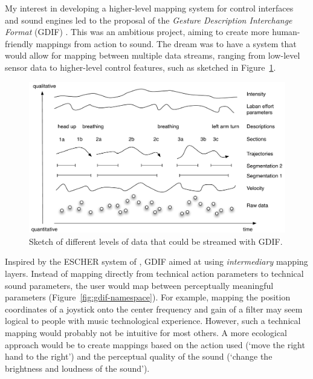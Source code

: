 My interest in developing a higher-level mapping system for control interfaces and sound engines led to the proposal of the \emph{Gesture Description Interchange Format} (GDIF) \citep{jensenius_towards_2006}. This was an ambitious project, aiming to create more human-friendly mappings from action to sound. The dream was to have a system that would allow for mapping between multiple data streams, ranging from low-level sensor data to higher-level control features, such as sketched in Figure~\ref{fig:gdif-streams}.

\begin{figure}[tbp]
 			\includegraphics[width=1\columnwidth]{figures/34-gdif-streams.pdf}
 			\caption{Sketch of different levels of data that could be streamed with GDIF.}
            \label{fig:gdif-streams}
\end{figure}

Inspired by the ESCHER system of \citet{wanderley_performer-instrument_2001}, GDIF aimed at using \emph{intermediary} mapping layers. Instead of mapping directly from technical action parameters to technical sound parameters, the user would map between perceptually meaningful parameters (Figure~\ref{fig:gdif-namespace}).
For example, mapping the position coordinates of a joystick onto the center frequency and gain of a filter may seem logical to people with music technological experience. However, such a technical mapping would probably not be intuitive for most others. A more ecological approach would be to create mappings based on the action used (`move the right hand to the right') and the perceptual quality of the sound (`change the brightness and loudness of the sound').


